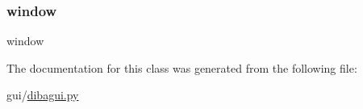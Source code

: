 \mbox{\label{classdibagui_1_1_main_win_a04a8a2bbfa9c15500892b8e5033d625b}} 
\subsubsection{\texorpdfstring{window}{window}}
{\footnotesize\ttfamily window}



The documentation for this class was generated from the following file\+:\begin{DoxyCompactItemize}
\item 
gui/\hyperlink{dibagui_8py}{dibagui.\+py}\end{DoxyCompactItemize}
